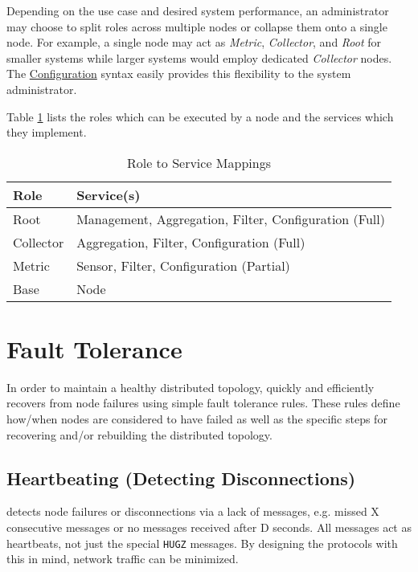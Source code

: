 Depending on the use case and desired system performance, an administrator may choose to split roles across multiple
nodes or collapse them onto a single node. For example, a single node may act as \textit{Metric}, \textit{Collector},
and \textit{Root} for smaller systems while larger systems would employ dedicated \textit{Collector} nodes. The \dcamp
\hyperref[configuration]{Configuration} syntax easily provides this flexibility to the system administrator.

Table \ref{tab:role_to_services} lists the roles which can be executed by a \dcamp node and the services which they
implement.

\begin{table}
\begin{tabular}{l l}

\hline
\textbf{Role} & \textbf{Service(s)} \\
\hline

Root & Management, Aggregation, Filter, Configuration (Full) \\

Collector & Aggregation, Filter, Configuration (Full) \\

Metric & Sensor, Filter, Configuration (Partial) \\

Base & Node \\

\end{tabular}
\caption{Role to Service Mappings}
\label{tab:role_to_services}
\end{table}

\section{Fault Tolerance}

In order to maintain a healthy distributed topology, \dcamp quickly and efficiently recovers from node failures using
simple fault tolerance rules. These rules define how/when nodes are considered to have failed as well as the specific
steps for recovering and/or rebuilding the distributed topology.

\subsection{Heartbeating (Detecting Disconnections)}

\dcamp detects node failures or disconnections via a lack of messages, e.g. missed X consecutive messages or no messages
received after D seconds. All messages act as heartbeats, not just the special \texttt{HUGZ} messages. By designing the
protocols with this in mind, network traffic can be minimized.

